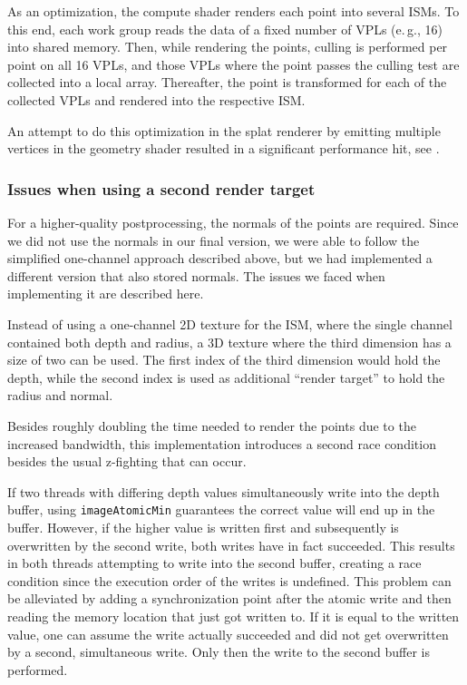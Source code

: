 As an optimization, the compute shader renders each point into several ISMs. To this end, each work group reads the data of a fixed number of VPLs (e.\,g., 16) into shared memory. Then, while rendering the points, culling is performed per point on all 16 VPLs, and those VPLs where the point passes the culling test are collected into a local array. Thereafter, the point is transformed for each of the collected VPLs and rendered into the respective ISM.


An attempt to do this optimization in the splat renderer by emitting multiple vertices in the geometry shader resulted in a significant performance hit, see .


\subsubsection{Issues when using a second render target}
\label{sec:impl:raceCondition}

For a higher-quality postprocessing, the normals of the points are required. Since we did not use the normals in our final version, we were able to follow the simplified one-channel approach described above, but we had implemented a different version that also stored normals. The issues we faced when implementing it are described here.

Instead of using a one-channel 2D texture for the ISM, where the single channel contained both depth and radius, a 3D texture where the third dimension has a size of two can be used. The first index of the third dimension would hold the depth, while the second index is used as additional ``render target'' to hold the radius and normal.

Besides roughly doubling the time needed to render the points due to the increased bandwidth, this implementation introduces a second race condition besides the usual z-fighting that can occur.

If two threads with differing depth values simultaneously write into the depth buffer, using \texttt{imageAtomicMin} guarantees the correct value will end up in the buffer. However, if the higher value is written first and subsequently is overwritten by the second write, both writes have in fact succeeded. This results in both threads attempting to write into the second buffer, creating a race condition since the execution order of the writes is undefined. This problem can be alleviated by adding a synchronization point after the atomic write and then reading the memory location that just got written to. If it is equal to the written value, one can assume the write actually succeeded and did not get overwritten by a second, simultaneous write. Only then the write to the second buffer is performed.

